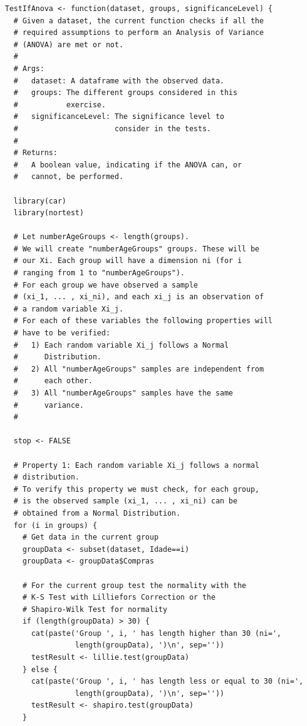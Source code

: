 \documentclass[12pt]{article}
\begin{document}
\begin{lstlisting}
TestIfAnova <- function(dataset, groups, significanceLevel) {
  # Given a dataset, the current function checks if all the
  # required assumptions to perform an Analysis of Variance
  # (ANOVA) are met or not.
  #
  # Args:
  #   dataset: A dataframe with the observed data.
  #   groups: The different groups considered in this
  #           exercise.
  #   significanceLevel: The significance level to
  #                      consider in the tests.
  #
  # Returns:
  #   A boolean value, indicating if the ANOVA can, or
  #   cannot, be performed.

  library(car)
  library(nortest)

  # Let numberAgeGroups <- length(groups).
  # We will create "numberAgeGroups" groups. These will be
  # our Xi. Each group will have a dimension ni (for i
  # ranging from 1 to "numberAgeGroups").
  # For each group we have observed a sample
  # (xi_1, ... , xi_ni), and each xi_j is an observation of
  # a random variable Xi_j.
  # For each of these variables the following properties will
  # have to be verified:
  #   1) Each random variable Xi_j follows a Normal
  #      Distribution.
  #   2) All "numberAgeGroups" samples are independent from
  #      each other.
  #   3) All "numberAgeGroups" samples have the same
  #      variance.
  #
  
  stop <- FALSE

  # Property 1: Each random variable Xi_j follows a normal
  # distribution.
  # To verify this property we must check, for each group,
  # is the observed sample (xi_1, ... , xi_ni) can be
  # obtained from a Normal Distribution.
  for (i in groups) {
    # Get data in the current group
    groupData <- subset(dataset, Idade==i)
    groupData <- groupData$Compras

    # For the current group test the normality with the
    # K-S Test with Lilliefors Correction or the
    # Shapiro-Wilk Test for normality
    if (length(groupData) > 30) {
      cat(paste('Group ', i, ' has length higher than 30 (ni=',
                length(groupData), ')\n', sep=''))
      testResult <- lillie.test(groupData)
    } else {
      cat(paste('Group ', i, ' has length less or equal to 30 (ni=',
                length(groupData), ')\n', sep=''))
      testResult <- shapiro.test(groupData)
    }


\end{lstlisting}
\end{document}
